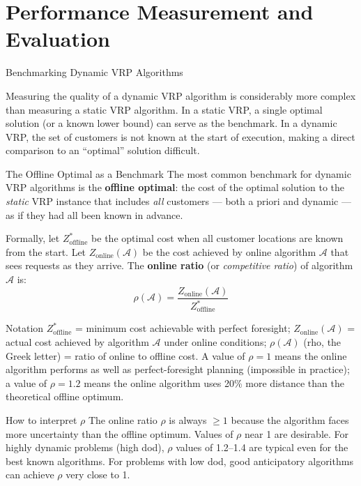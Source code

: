 \documentclass[aspectratio=169,10pt]{beamer}
\begin{document}
\section{Performance Measurement and Evaluation}

\begin{frame}[allowframebreaks]{Benchmarking Dynamic VRP Algorithms}

  Measuring the quality of a dynamic VRP algorithm is considerably more
  complex than measuring a static VRP algorithm.  In a static VRP, a single
  optimal solution (or a known lower bound) can serve as the benchmark.
  In a dynamic VRP, the set of customers is not known at the start of
  execution, making a direct comparison to an ``optimal'' solution difficult.

  \begin{block}{The Offline Optimal as a Benchmark}
    The most common benchmark for dynamic VRP algorithms is the
    \textbf{offline optimal}: the cost of the optimal solution to the
    \emph{static} VRP instance that includes \emph{all} customers —
    both a priori and dynamic — as if they had all been known in advance.

    \medskip
    Formally, let $Z^*_{\mathrm{offline}}$ be the optimal cost when all
    customer locations are known from the start.  Let $Z_{\mathrm{online}}(\mathcal{A})$
    be the cost achieved by online algorithm $\mathcal{A}$ that sees requests
    as they arrive.  The \textbf{online ratio} (or \emph{competitive ratio})
    of algorithm $\mathcal{A}$ is:
    \[
      \rho(\mathcal{A}) = \frac{Z_{\mathrm{online}}(\mathcal{A})}{Z^*_{\mathrm{offline}}}
    \]
  \end{block}

  \begin{block}{Notation}
    $Z^*_{\mathrm{offline}}$ = minimum cost achievable with perfect foresight;
    $Z_{\mathrm{online}}(\mathcal{A})$ = actual cost achieved by algorithm
    $\mathcal{A}$ under online conditions; $\rho(\mathcal{A})$ (rho, the Greek
    letter) = ratio of online to offline cost.  A value of $\rho = 1$ means the
    online algorithm performs as well as perfect-foresight planning (impossible
    in practice); a value of $\rho = 1.2$ means the online algorithm uses 20\%
    more distance than the theoretical offline optimum.
  \end{block}

  \begin{alertblock}{How to interpret $\rho$}
    The online ratio $\rho$ is always $\geq 1$ because the algorithm faces
    more uncertainty than the offline optimum.  Values of $\rho$ near 1 are
    desirable.  For highly dynamic problems (high dod), $\rho$ values of
    1.2--1.4 are typical even for the best known algorithms.
    For problems with low dod, good anticipatory algorithms can achieve
    $\rho$ very close to 1.
  \end{alertblock}


\end{frame}
\end{document}
